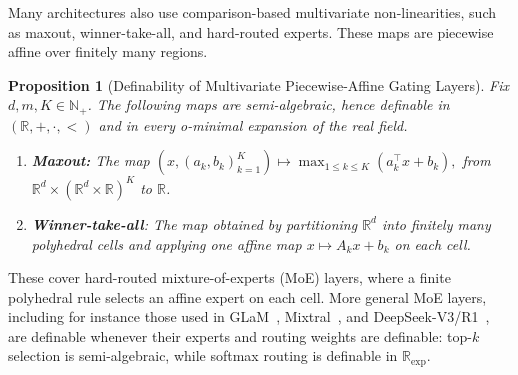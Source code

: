 \documentclass{article}
\newcommand{\eqdef}{\ensuremath{\stackrel{\mbox{\upshape\tiny def.}}{=}}}
\theoremstyle{plain}
\newtheorem{proposition}[theorem]{Proposition}
\theoremstyle{definition}
\theoremstyle{remark}
\theoremstyle{plain}
\numberwithin{thm}{section}
\theoremstyle{definition}
\numberwithin{equation}{section}
\begin{document}
Many architectures also use comparison-based multivariate non-linearities, such as maxout, winner-take-all, and hard-routed experts.  These maps are piecewise affine over finitely many regions.

\begin{proposition}[Definability of Multivariate Piecewise-Affine Gating Layers]
\label{prop:piecewise_affine_gating}
Fix $d,m,K\in\mathbb{N}_+$.  The following maps are semi-algebraic, hence definable in $(\mathbb{R},+,\cdot,<)$ and in every o-minimal expansion of the real field.

\begin{enumerate}
    \item[(i)] \textbf{Maxout:}  The map
    $
        (x,(a_k,b_k)_{k=1}^K)
        \mapsto
        \max_{1\le k\le K}(a_k^{\top} x+b_k),
    $
    from $\mathbb{R}^d\times(\mathbb{R}^d\times\mathbb{R})^K$ to $\mathbb{R}$.

    \item[(ii)] \textbf{Winner-take-all}: The  map obtained by partitioning $\mathbb{R}^d$ into finitely many polyhedral cells and applying one affine map $x\mapsto A_kx+b_k$ on each cell.
\end{enumerate}
\end{proposition}



These cover hard-routed mixture-of-experts (MoE) layers, where a finite polyhedral rule selects an affine expert on each cell.  More general MoE layers, including for instance those used in GLaM~\citep{du2022glamefficientscalinglanguage}, Mixtral~\citep{jiang2024mixtral}, and DeepSeek-V3/R1~\citep{deepseekai2025deepseekv3technicalreport,Guo_2025}, are definable whenever their experts and routing weights are definable: top-$k$ selection is semi-algebraic, while softmax routing is definable in $\mathbb{R}_{\exp}$.
\end{document}
